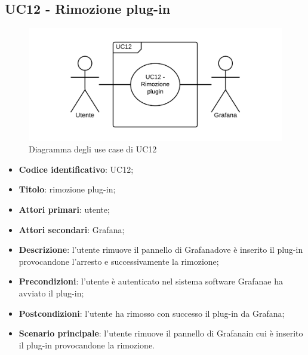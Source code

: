 \subsection{UC12 - Rimozione plug-in}
\begin{figure}[H]
\includegraphics{img/UC12_-_Rimozione_plugin.png}
\caption{Diagramma degli use case di UC12}
\end{figure}
\begin{itemize}
    \item \textbf{Codice identificativo}: UC12;
    \item \textbf{Titolo}: rimozione plug-in;
    \item \textbf{Attori primari}: utente;
    \item \textbf{Attori secondari}: Grafana\glo;
    \item \textbf{Descrizione}: l'utente rimuove il pannello di Grafana\glosp dove è inserito il plug-in provocandone l'arresto e successivamente la rimozione;
    \item \textbf{Precondizioni}: l'utente è autenticato nel sistema software Grafana\glosp e ha avviato il plug-in;
    \item \textbf{Postcondizioni}: l'utente ha rimosso con successo il plug-in da Grafana\glo;
    \item \textbf{Scenario principale}: l'utente rimuove il pannello di Grafana\glosp in cui è inserito il plug-in provocandone la rimozione.
\end{itemize}